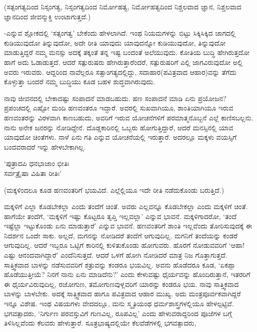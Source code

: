 (ಸತ್ಸಂಗತ್ವದಿಂದ ನಿಸ್ಸಂಗತ್ವ, ನಿಸ್ಸಂಗತ್ವದಿಂದ ನಿರ್ಮೋಹತ್ವ, ನಿರ್ಮೋಹತ್ವದಿಂದ ನಿಶ್ಚಲವಾದ ಜ್ಞಾನ, ನಿಶ್ಚಲವಾದ ಜ್ಞಾನದಿಂದ ಜೀವನ್ಮುಕ್ತಿ ಉಂಟಾಗುತ್ತದೆ.)

-ಎನ್ನುವ ಶ್ಲೋಕದಲ್ಲಿ `ಸತ್ಸಂಗತ್ವ' ಬೇಕೆಂದು ಹೇಳಲಾಗಿದೆ. ಇಂಥ ನಿಯಮಗಳನ್ನು ಬಿಟ್ಟು  ಸಿಕ್ಕಿಸಿಕ್ಕಿದ ಜಾಗದಲ್ಲಿ ಕುಡಿಯುವುದೋ ತಿನ್ನುವುದೋ, ಅದೇ ರೀತಿ ಯಾವುದು ಯಾವುದನ್ನೋ ಕುಡಿಯುವುದೋ, ತಿನ್ನುವುದೋ ಮಾಡುತ್ತಿದ್ದರೆ ನಮ್ಮ ಮನಸ್ಸು ಅದಕ್ಕೆ ತಕ್ಕಂತೆ ತನ್ನ ಇಷ್ಟ ಬಂದಂತೆ ಅಲೆಯುವುದು. ಕೋತಿಯ ಬುದ್ಧಿ ಹೇಗಿರುತ್ತದೋ ಹಾಗೆ ಅದು ಓಡಾಡುತ್ತದೆ. ಆದರೆ ಸತ್ಪುರುಷರು ಹೇಗಿರುತ್ತಾರೆಂದರೆ, ಸತ್ಪುರುಷರಿಗೆ ಎಲ್ಲಿ ಜಾಗವಿರುವುದೋ ಅಲ್ಲಿ ಅವರು ಇರುವರು. ಆದ್ದರಿಂದ ನಾವೆಲ್ಲರೂ ಸತ್ಸಾಂಗತ್ಯದಲ್ಲಿದ್ದು, ಸದಾಹಾರ(ಪವಿತ್ರವಾದ ಆಹಾರ)ವನ್ನು ತೆಗೆದು ಕೊಳ್ಳುತ್ತಾ ಬಂದರೆ ನಮ್ಮ ಬುದ್ಧಿಯು ಕೂಡ ಬಹಳ ಶುದ್ಧವಾಗಿರುವುದು.

ನಾವು ಜೀವನದಲ್ಲಿ ಬೇಕಾದಷ್ಟು ಸಂಪಾದನೆ ಮಾಡಬಹುದು. ಹಣ ಸಂಪಾದನೆ ಮಾಡಿ ಏನು ಪ್ರಯೋಜನ? ಪ್ರಪಂಚದಲ್ಲಿ ಎಷ್ಟೋ ಮಂದಿ ಹಣವಂತರೂ ಇದ್ದಾರೆ. ಅವರಲ್ಲಿ ಸುಖವಾಗಿಯೂ, ಶಾಂತಿಯಾಗಿಯೂ ಇರುವ ಹಣವಂತರನ್ನು ವಿರಳವಾಗಿ ಕಾಣಬಹುದು, ಅವರಿಗೆ ಇರುವ ಯೋಚನೆಗಳಿಗೆ ಪರಮಾತ್ಮನೊಬ್ಬನೆ ಎಲ್ಲೆ ಕಾಣಿಸಬಲ್ಲನು. ನಾನು ಅನೇಕ ಜನರನ್ನು ನೋಡಿದ್ದೇನೆ. ದೊಡ್ಡಕಾರಿನಲ್ಲಿ ಒಬ್ಬರು ಹೋಗುತ್ತಿದ್ದಾರೆ, ಆದರೆ ಮನಸ್ಸಿನಲ್ಲಿ ಯಾವ ಯಾವುದೋ ಚಿಂತೆಗಳು. ನಾಳೆ ಏನು ಗತಿ ಎನ್ನುವ ಯೋಚನೆಯಲ್ಲಿ ಇರುತ್ತಾರೆ. ಅದರಲ್ಲೂ ಮಕ್ಕಳು ವಯಸ್ಸಿಗೆ ಬಂದವರಾದರೆ ಇನ್ನು ಹೇಳಬೇಕಾಗಿಲ್ಲ.

\begin{shloka}
`ಪುತ್ರಾದಪಿ ಧನಭಾಜಾಂ ಭೀತಿಃ\\
ಸರ್ವತ್ರೈಷಾ ವಿಹಿತಾ ರೀತಿಃ'
\end{shloka}

(ಮಕ್ಕಳಿಂದಲೂ ಕೂಡ ಹಣವಂತರಿಗೆ ಭಯವಿದೆ. ಎಲ್ಲೆಲ್ಲಿಯೂ ಇದೇ ರೀತಿ ನಡೆದುಕೊಂಡು ಬರುತ್ತಿದೆ.)

ಮಕ್ಕಳಿಗೆ ಎಲ್ಲಾ ಕೊಡಬೇಕಲ್ಲಾ ಎಂದು ತಂದೆಗೆ ಚಿಂತೆ. ಅವರು ಎಲ್ಲವನ್ನೂ ಕೊಡಬೇಕಲ್ಲಾ ಎಂದು ಮಕ್ಕಳಿಗೆ ಚಿಂತೆ. ಹಾಗೆಯೇ ತಂದೆಗೆ, `ಮಕ್ಕಳಿಗೆ ಇಷ್ಟು ಕೊಟ್ಟರೂ ತೃಪ್ತಿ ಇಲ್ಲವಲ್ಲಾ' ಎನ್ನುವ ಭಾವನೆ. ಮಕ್ಕಳಿಗಾದರೋ, `ತಂದೆ ಇಷ್ಟೆಲ್ಲಾ ಇಟ್ಟುಕೊಂಡು ಏನು ಮಾಡುತ್ತಾರೆ' ಎನ್ನುವ ಭಾವನೆ. ಹಣವಂತರಿಗೆ ಶಾಂತಿ ಇಲ್ಲವೆಂದು ತೋರಿಸುವುದಕ್ಕೆ ಈ ನಿದರ್ಶನ ಒಂದೇ ಸಾಕು. ಅಲ್ಲದೆ, ಮಗನನ್ನು ನೋಡಿದರೆ ತಂದೆಗೆ ಆಗುವುದಿಲ್ಲ. ಮಗನಿಗೆ ತಂದೆಯನ್ನು ಕಂಡರೆ ಆಗುವುದಿಲ್ಲ. ಆದರೆ ಇಬ್ಬರೂ ಒಟ್ಟಿಗೆ ಕಾರಿನಲ್ಲಿ ಕುಳಿತುಕೊಂಡು ಹೋಗುವರು. ಹೊರಗೆ ನೋಡುವವರಿಗೆ `ಆಹಾ! ಎಷ್ಟು ಆನಂದವಾಗಿದ್ದಾರೆ' ಎಂದೆನಿಸುತ್ತದೆ. ಆದರೆ ಒಳಗೆ ಹೋಗಿ ನೋಡಿದರೆ ಮಾತ್ರ ನಿಜ ಗೊತ್ತಾಗುತ್ತದೆ. ಸಾತ್ತ್ವಿಕವಾದ ಬಾಳನ್ನು ನಡೆಸುವವರಿಗೆ ಶತ್ರುವನ್ನು ಕಂಡರೂ ಭಯವಿಲ್ಲ. ಅವನು ಹೊಡೆದರೂ ಕೂಡ, `ಏಕಪ್ಪಾ ಹೊಡೆಯುತ್ತೀಯೆ? ನಿನಗೆ ನಾನು ಏನು ಮಾಡಿದೆನು?' ಎಂದು ಕೇಳುವಷ್ಟು ಧೈರ್ಯವನ್ನು ಹೊಂದಿರುತ್ತಾನೆ, ಇತರರಿಗೆ ಈ ಧೈರ್ಯವಿರುವುದಿಲ್ಲ, ರಜೋಗುಣ, ತಮೋಗುಣವುಳ್ಲವರಿಗೆ ಯಾರನ್ನು ಕಂಡರೂ ಭಯ. ನಾವು ಸಾತ್ತ್ವಿಕವಾದ ಬಾಳನ್ನು ಬಾಳಬೇಕು. ಅದಕ್ಕೆ ಸಾತ್ತ್ವಿಕವಾದ ಹಾಗೂ ಪವಿತ್ರವಾದ ಆಹಾರ ಮುಖ್ಯ. ಅದು ಮಂತ್ರಪೂರ್ವಕವಾಗಿದ್ದರೆ ಇನ್ನೂ ವಿಶೇಷ. ಇಂಥ ವಿಷಯಗಳು ವೇದದಲ್ಲೂ, ಮನು ಸ್ಮೃತಿಯಂಥ ಧರ್ಮಶಾಸ್ತ್ರಗಳಲ್ಲಿಯೂ ಹೇಳಲ್ಪಟ್ಟಿವೆ. ಭಗವತ್ಪಾದರು, `ನಿರ್ಗುಣ ಪರವಸ್ತುವಿಗೆ ಗುಣವಿಲ್ಲ, ರೂಪವಿಲ್ಲ' ಎಂದು ಹೇಳುವರಾದ್ದರಿಂದ ಪೂಜೆಗಳ ಬಗ್ಗೆ ತಿಳಿಸಿಲ್ಲವೆಂದು ಕೆಲವರು ಹೇಳುತ್ತಾರೆ. ಸೂತ್ರಭಾಷ್ಯದಲ್ಲಿಯೇ ಕೆಲವೆಡೆಗಳಲ್ಲಿ ಭಗವತ್ಪಾದರು,

